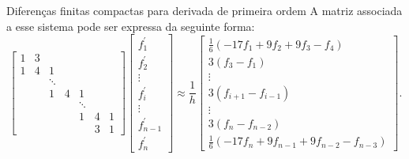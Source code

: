 \begin{frame}{Diferenças finitas compactas para derivada de primeira ordem}
A matriz associada a esse sistema pode ser expressa da seguinte forma:
\begin{equation}
\left[\begin{array}{ccccccc}
1 & 3 & & & & & \\
1 & 4 & 1 & & & & \\
& & \ddots & & & & \\
& & 1 & 4 & 1 & & \\
& & & & \ddots & & \\
& & & & 1 & 4 & 1 \\
& & & & & 3 & 1
\end{array}\right]\left[\begin{array}{c}
f_1^{\prime} \\
f_2^{\prime} \\
\vdots \\
f_i^{\prime} \\
\vdots \\
f_{n-1}^{\prime} \\
f_n^{\prime}
\end{array}\right] \approx \frac{1}{h}\left[\begin{array}{c}\frac{1}{6}\left(-17f_1 + 9f_2 + 9f_3 - f_4 \right) \\ 3(f_3 - f_1) \\ \vdots \\ 3\left(f_{i+1}-f_{i-1}\right) \\ \vdots \\ 3\left(f_{n}-f_{n-2}\right) \\ \frac{1}{6}\left(-17f_n + 9f_{n-1} + 9f_{n-2} - f_{n-3}\right)\end{array}\right].
\end{equation}
\end{frame}

